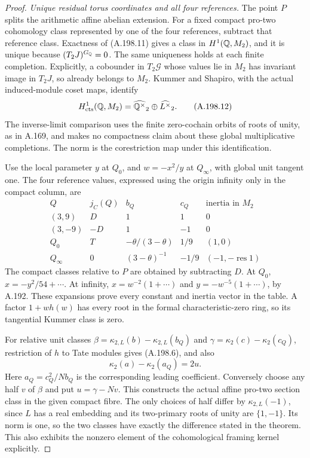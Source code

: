 \begin{proof}
\emph{Unique residual torus coordinates and all four references.}
The point \(P\) splits the arithmetic affine abelian extension.
For a fixed compact pro-two cohomology class represented by one
of the four references, subtract that reference class.  Exactness
of (A.198.11) gives a class in \(H^1(\mathbb Q,M_2)\), and it is unique
because \((T_2J)^{G_\mathbb Q}=0\).  The same uniqueness holds at each
finite completion.  Explicitly, a cobounder in \(T_2\mathcal G\)
whose values lie in \(M_2\) has invariant image in \(T_2J\),
so already belongs to \(M_2\).
Kummer and Shapiro, with the actual induced-module coset maps,
identify
\[
 H^1_{\rm cts}(\mathbb Q,M_2)=
          \widehat{\mathbb Q^\times}_2\oplus\widehat{L^\times}_2.
\tag{A.198.12}
\]
The inverse-limit comparison uses the finite zero-cochain orbits
of roots of unity, as in A.169, and makes no compactness claim
about these global multiplicative completions.
The norm is the corestriction map under this identification.

Use the local parameter \(y\) at \(Q_0\), and
\(w=-x^2/y\) at \(Q_\infty\), with global unit tangent one.
The four reference values, expressed using the origin infinity
only in the compact column, are
\[
\begin{array}{c|c|c|c|c}
 Q&j_C(Q)&b_Q&c_Q&\text{inertia in }M_2\\ \hline
 (3,9)&D&1&1&0\\
 (3,-9)&-D&1&-1&0\\
 Q_0&T&-\theta/(3-\theta)&1/9&(1,0)\\
 Q_\infty&0&(3-\theta)^{-1}&-1/9&(-1,-\operatorname{res}1)
\end{array}
\tag{A.198.13}
\]
The compact classes relative to \(P\) are obtained by subtracting
\(D\).  At \(Q_0\), \(x=-y^2/54+\cdots\).
At infinity, \(x=w^{-2}(1+\cdots)\) and
\(y=-w^{-5}(1+\cdots)\), by A.192.
These expansions prove every constant and inertia vector in the
table.  A factor \(1+w h(w)\) has every root in the formal
characteristic-zero ring, so its tangential Kummer class is zero.

For relative unit classes
\(\beta=\kappa_{2,L}(b)-\kappa_{2,L}(b_Q)\) and
\(\gamma=\kappa_2(c)-\kappa_2(c_Q)\), restriction of \(h\)
to Tate modules gives (A.198.6), and also
\[
                    \kappa_2(a)-\kappa_2(a_Q)=2u.
\tag{A.198.14}
\]
Here \(a_Q=c_Q^2/Nb_Q\) is the corresponding leading coefficient.
Conversely choose any half \(v\) of \(\beta\) and put
\(u=\gamma-Nv\).  This constructs the actual affine pro-two
section class in the given compact fibre.  The only choices of
half differ by \(\kappa_{2,L}(-1)\), since \(L\) has a real
embedding and its two-primary roots of unity are \(\{1,-1\}\).
Its norm is one, so the two classes have exactly the difference
stated in the theorem.  This also exhibits the nonzero element
of the cohomological framing kernel explicitly.


\end{proof}
